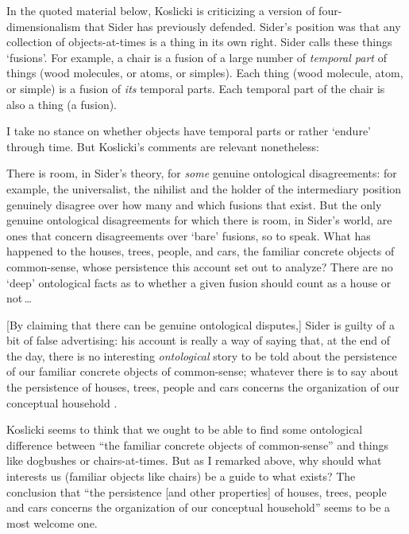\documentclass[11pt]{article}
\newenvironment{squote}{%
\begin{spacing}{1}
       	\begin{list}{}{%
\setlength{\labelwidth}{0pt}%
\rightmargin\leftmargin%
}
\item\relax
}{%
\end{list}%
\end{spacing}
}
\begin{document}
\begin{spacing}{1.25}
In the quoted material below, Koslicki is criticizing a version of
four-dimensionalism that Sider has previously defended.  Sider's
position was that any collection of objects-at-times is a thing in its
own right.  Sider calls these things `fusions'.  For example, a chair
is a fusion of a large number of {\em temporal part} of things (wood
molecules, or atoms, or simples).  Each thing (wood molecule, atom, or
simple) is a fusion of {\em its} temporal parts.  Each temporal part
of the chair is also a thing (a fusion).

I take no stance on whether objects have temporal parts or rather
`endure' through time.  But Koslicki's comments are relevant
nonetheless:

\begin{squote}
There is room, in Sider's theory, for {\em some} genuine ontological
disagreements: for example, the universalist, the nihilist and the
holder of the intermediary position genuinely disagree over how many
and which fusions that exist.  But the only genuine ontological
disagreements for which there is room, in Sider's world, are ones that
concern disagreements over `bare' fusions, so to speak.  What has
happened to the houses, trees, people, and cars, the familiar concrete
objects of common-sense, whose persistence this account set out to
analyze?  There are no `deep' ontological facts as to whether a given
fusion should count as a house or not\,\ldots

[By claiming that there can be genuine ontological disputes,] Sider is
guilty of a bit of false advertising: his account is really a way of
saying that, at the end of the day, there is no interesting {\em
  ontological} story to be told about the persistence of our familiar
concrete objects of common-sense; whatever there is to say about the
persistence of houses, trees, people and cars concerns the
organization of our conceptual household
\citeyearpar[124--125]{koslicki2003}.
\end{squote}

Koslicki seems to think that we ought to be able to find some
ontological difference between ``the familiar concrete objects of
common-sense'' and things like dogbushes or chairs-at-times.  But as I
remarked above, why should what interests us (familiar objects like
chairs) be a guide to what exists?  The conclusion that ``the
persistence [and other properties] of houses, trees, people and cars
concerns the organization of our conceptual household'' seems to be a
most welcome one.


\end{spacing}
\end{document}
